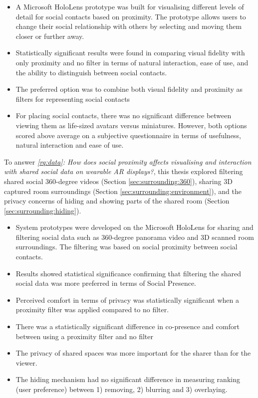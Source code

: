 \begin{itemize}
    \item{A Microsoft HoloLens prototype was built for visualising different levels of detail for social contacts based on proximity. The prototype allows users to change their social relationship with others by selecting and moving them closer or further away.}
    \item{Statistically significant results were found in comparing visual fidelity with only proximity and no filter in terms of natural interaction, ease of use, and the ability to distinguish between social contacts.}
    \item{The preferred option was to combine both visual fidelity and proximity as filters for representing social contacts}
    \item{For placing social contacts, there was no significant difference between viewing them as life-sized avatars versus miniatures. However, both options scored above average on a subjective questionnaire in terms of usefulness, natural interaction and ease of use.}
\end{itemize}

\noindent
To answer \textit{\ref{rq:data}: How does social proximity affects visualising and interaction with shared social data on wearable AR displays?}, this thesis explored filtering shared social 360-degree videos (Section \ref{sec:surrounding:360}), sharing 3D captured room surroundings (Section \ref{sec:surrounding:environment}), and the privacy concerns of hiding and showing parts of the shared room (Section \ref{sec:surrounding:hiding}). 

\begin{itemize}
    \item{System prototypes were developed on the Microsoft HoloLens for sharing and filtering social data such as 360-degree panorama video and 3D scanned room surroundings. The filtering was based on social proximity between social contacts.}
    \item{Results showed statistical significance confirming that filtering the shared social data was more preferred in terms of Social Presence.}
    \item{Perceived comfort in terms of privacy was statistically significant when a proximity filter was applied compared to no filter.}
    \item{There was a statistically significant difference in co-presence and comfort between using a proximity filter and no filter}
    \item{The privacy of shared spaces was more important for the sharer than for the viewer.}
    \item{The hiding mechanism had no significant difference in measuring ranking (user preference) between 1) removing, 2) blurring and 3) overlaying.}
\end{itemize}

